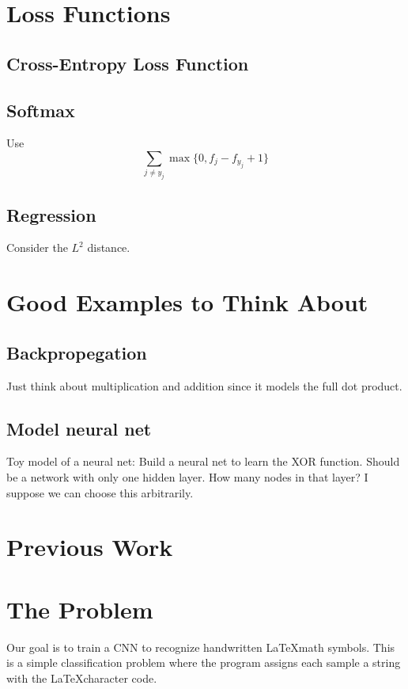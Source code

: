 \documentclass[12pt,letterpaper,boxed]{article}
\begin{document}
\section{Loss Functions}
	\subsection{Cross-Entropy Loss Function}

	\subsection{Softmax}
		Use
		\[
			\sum_{j \neq y_j} \max \{0, f_j - f_{y_j} + 1\}
		\]

	\subsection{Regression}
		Consider the $L^2$ distance.

\section{Good Examples to Think About}
	\subsection{Backpropegation}
		Just think about multiplication and addition since it models the full dot product.

	\subsection{Model neural net}
		Toy model of a neural net:
			Build a neural net to learn the XOR function.
		Should be a network with only one hidden layer. How many nodes in that layer? I suppose we can choose this arbitrarily.

\section{Previous Work}

\section{The Problem}
	Our goal is to train a CNN to recognize handwritten \LaTeX math symbols. This is a simple classification problem where the program assigns each sample a string with the \LaTeX character code.
\end{document}
